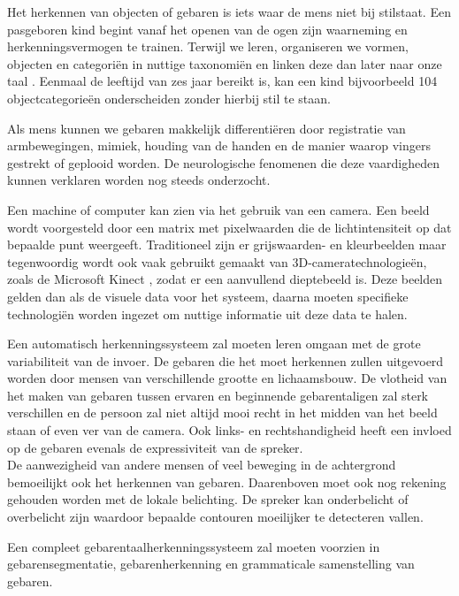 \npar Het herkennen van objecten of gebaren is iets waar de mens niet bij stilstaat. Een pasgeboren kind begint vanaf het openen van de ogen zijn waarneming en herkenningsvermogen te trainen. Terwijl we leren, organiseren we vormen, objecten en categori\"en in nuttige taxonomi\"en en linken deze dan later naar onze taal \cite{oneshot-object-cat}. Eenmaal de leeftijd van zes jaar bereikt is, kan een kind bijvoorbeeld 104 objectcategorie\"en onderscheiden zonder hierbij stil te staan.

\npar Als mens kunnen we gebaren makkelijk differenti\"eren door registratie van armbewegingen, mimiek, houding van de handen en de manier waarop vingers gestrekt of geplooid worden. De neurologische fenomenen die deze vaardigheden kunnen verklaren worden nog steeds onderzocht. 

\npar Een machine of computer kan zien via het gebruik van een camera. Een beeld wordt voorgesteld door een matrix met pixelwaarden die de lichtintensiteit op dat bepaalde punt weergeeft. Traditioneel zijn er grijswaarden- en kleurbeelden maar tegenwoordig wordt ook vaak gebruikt gemaakt van 3D-cameratechnologie\"en, zoals de Microsoft Kinect \cite{kuhn2011kinect}, zodat er een aanvullend dieptebeeld is. Deze beelden gelden dan als de visuele data voor het systeem, daarna moeten specifieke technologi\"en worden ingezet om nuttige informatie uit deze data te halen.

\npar Een automatisch herkenningssysteem zal moeten leren omgaan met de grote variabiliteit van de invoer. De gebaren die het moet herkennen zullen uitgevoerd worden door mensen van verschillende grootte en lichaamsbouw. De vlotheid van het maken van gebaren tussen ervaren en beginnende gebarentaligen zal sterk verschillen en de persoon zal niet altijd mooi recht in het midden van het beeld staan of even ver van de camera. Ook links- en rechtshandigheid heeft een invloed op de gebaren evenals de expressiviteit van de spreker.
\\ De aanwezigheid van andere mensen of veel beweging in de achtergrond bemoeilijkt ook het herkennen van gebaren. Daarenboven moet ook nog rekening gehouden worden met de lokale belichting. De spreker kan onderbelicht of overbelicht zijn waardoor bepaalde contouren moeilijker te detecteren vallen.

\npar Een compleet gebarentaalherkenningssysteem zal moeten voorzien in gebarensegmentatie, gebarenherkenning en grammaticale samenstelling van gebaren.

